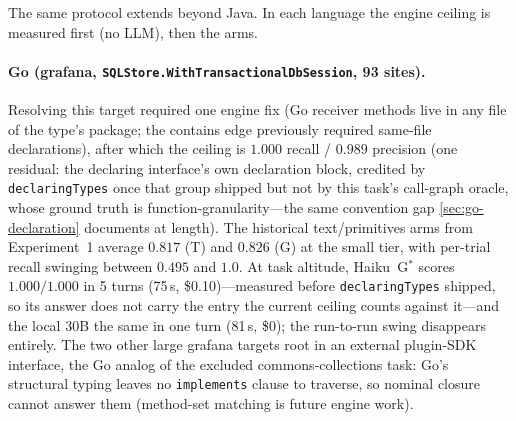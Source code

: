 \documentclass[11pt]{article}
\newcommand{\code}[1]{\texttt{#1}}
\newcommand{\gstar}{G$^{*}$}
\begin{document}
The same protocol extends beyond Java. In each language the engine
ceiling is measured first (no LLM), then the arms.

\paragraph{Go (grafana, \code{SQLStore.WithTransactionalDbSession}, 93
sites).} Resolving this target required one engine fix (Go receiver
methods live in any file of the type's package; the contains edge
previously required same-file declarations), after which the ceiling is
$1.000$ recall / $0.989$ precision (one residual: the declaring interface's
own declaration block, credited by \code{declaringTypes} once that group
shipped but not by this task's call-graph oracle, whose ground truth is
function-granularity---the same convention gap \cref{sec:go-declaration}
documents at length). The historical text/primitives arms
from Experiment~1 average $0.817$ (T) and $0.826$ (G) at the small tier,
with per-trial recall swinging between $0.495$ and $1.0$. At task altitude,
Haiku~\gstar{} scores $1.000/1.000$ in 5 turns (75\,s, \$0.10)---measured
before \code{declaringTypes} shipped, so its answer does not carry the
entry the current ceiling counts against it---and the local
30B the same in one turn (81\,s, \$0); the run-to-run swing disappears
entirely. The two other large grafana targets root in an
external plugin-SDK interface, the Go analog of the excluded
commons-collections task: Go's structural typing leaves no
\code{implements} clause to traverse, so nominal closure cannot answer
them (method-set matching is future engine work).
\end{document}
